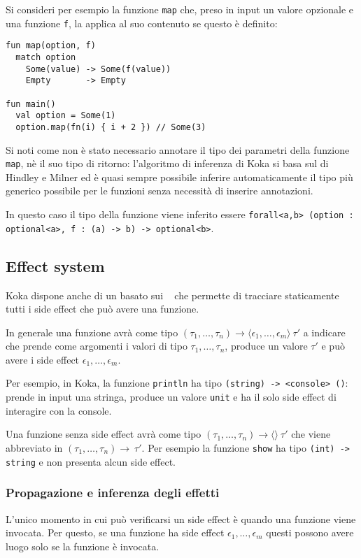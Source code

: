 Si consideri per esempio la funzione \lstinline{map} che, preso in input un valore opzionale e una funzione \lstinline{f}, la applica al suo contenuto se questo è definito:
\begin{lstlisting}[language=koka]
fun map(option, f)
  match option
    Some(value) -> Some(f(value))
    Empty       -> Empty

fun main()
  val option = Some(1)
  option.map(fn(i) { i + 2 }) // Some(3)
\end{lstlisting}

Si noti come non è stato necessario annotare il tipo dei parametri della funzione \lstinline{map}, nè il suo tipo di ritorno: l'algoritmo di inferenza di Koka si basa sul  di Hindley e Milner ed è quasi sempre possibile inferire automaticamente il tipo più generico possibile per le funzioni senza necessità di inserire annotazioni.

In questo caso il tipo della funzione viene inferito essere \lstinline{forall<a,b> (option : optional<a>, f : (a) -> b) -> optional<b>}.

\subsection{Effect system}
Koka dispone anche di un  basato sui ~\cite{cit:koka-programming-with-row-polymorphic-effect-types} che permette di tracciare staticamente tutti i side effect che può avere una funzione.

In generale una funzione avrà come tipo $(\tau_1, \dots, \tau_n) \rightarrow \langle\epsilon_1,\dots,\epsilon_m\rangle\ \tau'$ a indicare che prende come argomenti i valori di tipo $\tau_1, \dots, \tau_n$, produce un valore $\tau'$ e può avere i side effect $\epsilon_1,\dots,\epsilon_m$.

Per esempio, in Koka, la funzione \lstinline{println} ha tipo \lstinline{(string) -> <console> ()}: prende in input una stringa, produce un valore \lstinline{unit} e ha il solo side effect di interagire con la console.

Una funzione senza side effect avrà come tipo $(\tau_1, \dots, \tau_n) \rightarrow \langle\rangle\ \tau'$ che viene abbreviato in $(\tau_1, \dots, \tau_n) \rightarrow\ \tau'$. Per esempio la funzione \lstinline{show} ha tipo \lstinline{(int) -> string} e non presenta alcun side effect.

\subsubsection{Propagazione e inferenza degli effetti}
L'unico momento in cui può verificarsi un side effect è quando una funzione viene invocata. Per questo, se una funzione ha side effect $\epsilon_1,\dots,\epsilon_m$ questi possono avere luogo solo se la funzione è invocata.

